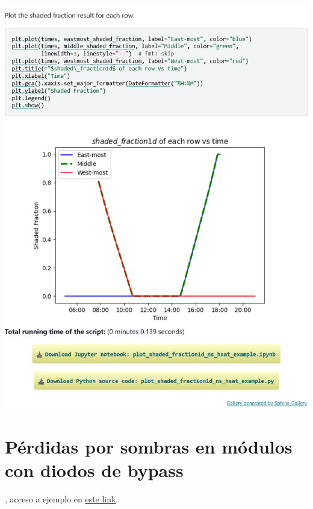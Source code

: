 \begin{myparindent}{0pt}
\includegraphics[width=\linewidth,height=0.9\textheight,keepaspectratio]{images/docs_examples_cut/shaded_fraction_2.png}

\newpage\section{Pérdidas por sombras en módulos con diodos de bypass} \label{sct:doc_ej_perdidas_sombra}

, acceso a ejemplo en \href{https://pvlib-python.readthedocs.io/en/latest/gallery/shading/plot_martinez_shade_loss.html}{este link}.


\end{myparindent}
